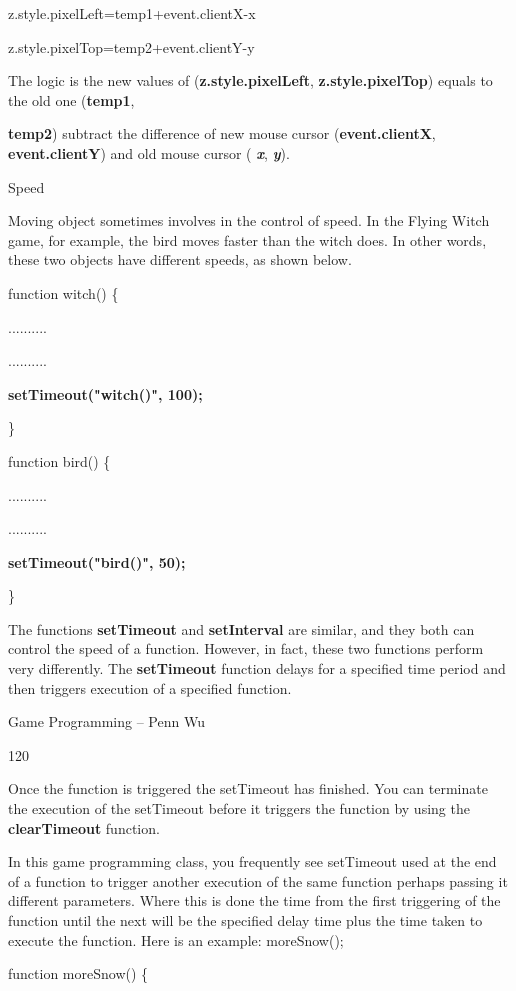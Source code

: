 \documentclass[
]{article}
\begin{document}
z.style.pixelLeft=temp1+event.clientX-x

z.style.pixelTop=temp2+event.clientY-y

The logic is the new values of (\textbf{z.style.pixelLeft},
\textbf{z.style.pixelTop}) equals to the old one (\textbf{temp1},
\textbf{}

\textbf{temp2}) subtract the difference of new mouse cursor
(\textbf{event.clientX}, \textbf{event.clientY}) and old mouse cursor (
\emph{\textbf{x}}, \emph{\textbf{y}}).

Speed

Moving object sometimes involves in the control of speed. In the Flying
Witch game, for example, the bird moves faster than the witch does. In
other words, these two objects have different speeds, as shown below.

function witch() \{

..........

..........

\textbf{setTimeout("witch()", 100);}

\}

function bird() \{

..........

..........

\textbf{setTimeout("bird()", 50);}

\}

The functions \textbf{setTimeout} and \textbf{setInterval} are similar,
and they both can control the speed of a function. However, in fact,
these two functions perform very differently. The \textbf{setTimeout}
function delays for a specified time period and then triggers execution
of a specified function.

Game Programming -- Penn Wu

120

\protect\hypertarget{index_split_008.htmlux5cux23p121}{}{}Once the
function is triggered the setTimeout has finished. You can terminate the
execution of the setTimeout before it triggers the function by using the
\textbf{clearTimeout} function.

In this game programming class, you frequently see setTimeout used at
the end of a function to trigger another execution of the same function
perhaps passing it different parameters. Where this is done the time
from the first triggering of the function until the next will be the
specified delay time plus the time taken to execute the function. Here
is an example: moreSnow();

function moreSnow() \{
\end{document}
